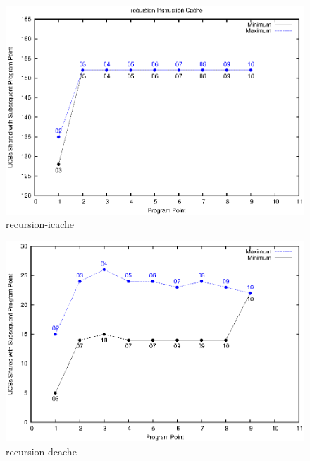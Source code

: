 \begin{figure}[h]
\begin{center}
    \includegraphics[scale = .65, clip]{eps/recursion-icache.eps}
\caption{recursion-icache}\label{fig:recursion-icache}
\end{center}
\end{figure}

\begin{figure}[h]
\begin{center}
    \includegraphics[scale = .65, clip]{eps/recursion-dcache.eps}
\caption{recursion-dcache}\label{fig:recursion-dcache}
\end{center}
\end{figure}

